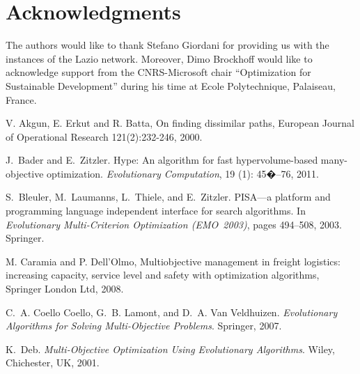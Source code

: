 \documentclass[preprint,12pt]{elsarticle}
\begin{document}
\section{Acknowledgments}
The authors would like to thank Stefano Giordani for providing us with the instances of the Lazio network. Moreover, Dimo Brockhoff would like to acknowledge support from the CNRS-Microsoft chair "`Optimization for Sustainable Development"' during his time at Ecole Polytechnique, Palaiseau, France.


% 
 
 \footnotesize
% 

\begin{thebibliography}{00}

V. Akgun, E. Erkut and R. Batta, 
On finding dissimilar paths, 
European Journal of Operational Research 121(2):232-246, 2000.

J.~Bader and E.~Zitzler.
\newblock Hype: An algorithm for fast hypervolume-based many-objective
  optimization.
\newblock \emph{Evolutionary Computation}, 19 (1): 45�--76,
  2011.

S.~Bleuler, M.~Laumanns, L.~Thiele, and E.~Zitzler.
\newblock PISA---a platform and programming language independent interface for
  search algorithms.
\newblock In \emph{Evolutionary
  Multi-Criterion Optimization {(EMO~2003)}}, pages
  494--508, 2003. Springer.

M. Caramia and P. Dell'Olmo, 
Multiobjective management in freight logistics: increasing capacity, service level and safety with optimization algorithms,
Springer London Ltd, 2008.

C.~A. {Coello Coello}, G.~B. {Lamont}, and D.~A. {Van Veldhuizen}.
\newblock \emph{Evolutionary Algorithms for Solving Multi-Objective Problems}.
\newblock Springer, 2007.

K.~Deb.
\newblock \emph{Multi-Objective Optimization Using Evolutionary Algorithms}.
\newblock Wiley, Chichester, UK, 2001.


\end{thebibliography}
\end{document}
